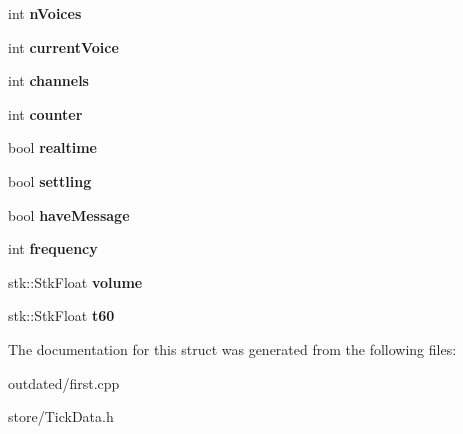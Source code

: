 \begin{DoxyCompactItemize}
\item 
int {\bfseries n\+Voices}\hypertarget{structTickData_ac53a7ecd6dfff24019bfb607202f6024}{}\label{structTickData_ac53a7ecd6dfff24019bfb607202f6024}

\item 
int {\bfseries current\+Voice}\hypertarget{structTickData_a620ca81cff77e4cdaf0025b73bc37e61}{}\label{structTickData_a620ca81cff77e4cdaf0025b73bc37e61}

\item 
int {\bfseries channels}\hypertarget{structTickData_ad147869433dc1b3526aa9f4dbb3b4cc5}{}\label{structTickData_ad147869433dc1b3526aa9f4dbb3b4cc5}

\item 
int {\bfseries counter}\hypertarget{structTickData_a54ba17f6bb83ce8efe0758614221f026}{}\label{structTickData_a54ba17f6bb83ce8efe0758614221f026}

\item 
bool {\bfseries realtime}\hypertarget{structTickData_aa60016ecb88b0bdae8395aa7517a6f1f}{}\label{structTickData_aa60016ecb88b0bdae8395aa7517a6f1f}

\item 
bool {\bfseries settling}\hypertarget{structTickData_a4682f375c65eb79d9166933ec9c79c2b}{}\label{structTickData_a4682f375c65eb79d9166933ec9c79c2b}

\item 
bool {\bfseries have\+Message}\hypertarget{structTickData_a142d947db0ab6e66f8f912c51a4bafdb}{}\label{structTickData_a142d947db0ab6e66f8f912c51a4bafdb}

\item 
int {\bfseries frequency}\hypertarget{structTickData_ade8d551a52ad93b8f056bf5da813c64c}{}\label{structTickData_ade8d551a52ad93b8f056bf5da813c64c}

\item 
stk\+::\+Stk\+Float {\bfseries volume}\hypertarget{structTickData_a81bc42e25163a7afb9725153fac3d713}{}\label{structTickData_a81bc42e25163a7afb9725153fac3d713}

\item 
stk\+::\+Stk\+Float {\bfseries t60}\hypertarget{structTickData_a9916301f9f675256327e1ac0bdb8f9f4}{}\label{structTickData_a9916301f9f675256327e1ac0bdb8f9f4}

\end{DoxyCompactItemize}


The documentation for this struct was generated from the following files\+:\begin{DoxyCompactItemize}
\item 
outdated/first.\+cpp\item 
store/Tick\+Data.\+h\end{DoxyCompactItemize}
